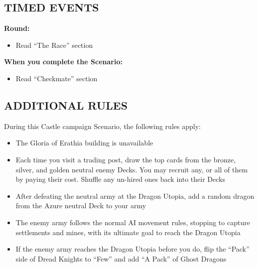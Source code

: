 \newpage

\begin{multicols}{2}

\subsection*{\MakeUppercase{Timed Events}}

\textbf{ Round:}
\begin{itemize}
  \item Read ``The Race'' section
\end{itemize}

\textbf{When you complete the Scenario:}
\begin{itemize}
  \item Read ``Checkmate'' section
\end{itemize}

\subsection*{\MakeUppercase{Additional rules}}

During this Castle campaign Scenario, the following rules apply:

\begin{itemize}
  \item The Gloria of Erathia building is unavailable
  \item Each time you visit a trading post, draw the top cards from the  bronze,  silver, and  golden neutral enemy Decks. You may recruit any, or all of them by paying their cost. Shuffle any un-hired ones back into their Decks
  \item After defeating the neutral army at the Dragon Utopia, add a random dragon from the  Azure neutral Deck to your army
  \item The enemy army follows the normal AI movement rules, stopping to capture settlements and mines, with its ultimate goal to reach the Dragon Utopia
  \item If the enemy army reaches the Dragon Utopia before you do, flip the ``Pack'' side of Dread Knights to ``Few'' and add ``A Pack'' of Ghost Dragons
\end{itemize}

\end{multicols}

